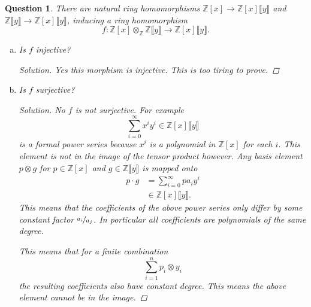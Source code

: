 \documentclass{article}
\newcommand{\Z}{\mathbb{Z}}
\newcommand{\powser}[2]{#1\llbracket#2\rrbracket}
\newenvironment{solution}{\begin{proof}[Solution]\renewcommand\qedsymbol{}}{\end{proof}}
\newtheorem{question}{Question}
\theoremstyle{definition}
\begin{document}
\begin{question}
    There are natural ring homomorphisms \(\Z[x]\to\powser{\Z[x]}{y}\) and
    \(\powser{\Z}{y}\to\powser{\Z[x]}{y}\), inducing a ring homomorphism
    \[
        f:\Z[x]\otimes_{\Z}\powser{\Z}{y}\to\powser{\Z[x]}{y}.
    \]
    \begin{enumerate}[(a)]
        \item Is \(f\) injective?

              \begin{solution}
                  Yes this morphism is injective. This is too tiring to prove.
              \end{solution}

        \item Is \(f\) surjective?

              \begin{solution}
                  No \(f\) is not surjective. For example
                  \[
                      \sum_{i=0}^{\infty}x^{i}y^{i}\in\powser{\Z[x]}{y}
                  \]
                  is a formal power series because \(x^{i}\) is a polynomial in
                  \(\Z[x]\) for each \(i\). This element is not in the image of
                  the tensor product however. Any basis element \(p\otimes g\)
                  for \(p\in\Z[x]\) and \(g\in\powser{\Z}{y}\) is mapped onto
                  \begin{align*}
                      p\cdot g & =\sum_{i=0}^{\infty}pa_{i}y^{i} \\
                               & \in\powser{\Z[x]}{y}.
                  \end{align*}
                  This means that the coefficients of the above power series
                  only differ by some constant factor
                  \(\nicefrac{a_{i}}{a_{j}}\). In porticular all coefficients
                  are polynomials of the same degree.

                  This means that for a finite combination
                  \[
                      \sum_{i=1}^{n}p_{i}\otimes y_{i}
                  \]
                  the resulting coefficients also have constant degree. This
                  means the above element cannot be in the image.
              \end{solution}
    \end{enumerate}
\end{question}
\end{document}
